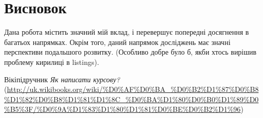\documentclass[a4paper,14pt]{extreport}
\begin{document}
	\chapter{Висновок} 
	Дана робота містить значний мій вклад, і перевершує попередні досягнення в багатьох напрямках. Окрім того, даний напрямок досліджень має значні перспективи
	подальшого розвитку. (Особливо добре було б, якби хтось вирішив проблему кирилиці в listings).
	
	
	\newpage
	\begin{thebibliography}{9}
		
		 Вікіпідручник \emph{Як написати курсову?}
		(\url{http://uk.wikibooks.org/wiki/%D0%AF%D0%BA_%D0%B2%D1%87%D0%B8%D1%82%D0%B8%D1%81%D1%8C_%D0%BA%D1%80%D0%B0%D1%89%D0%B5%3F/%D0%9A%D1%83%D1%80%D1%81%D0%BE%D0%B2%D1%96})
			
		\end{thebibliography}
	
\end{document}
